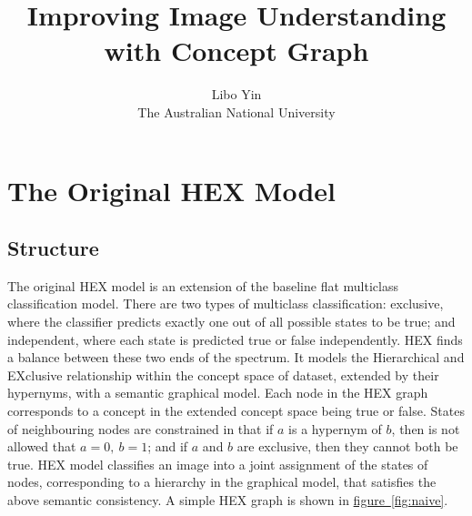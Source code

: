 \documentclass[11pt,a4paper]{article}
\begin{document}
\title{Improving Image Understanding with Concept Graph}
\author{Libo Yin\\The Australian National University}
\maketitle
\section{The Original HEX Model}
\subsection{Structure}

The original HEX model \cite{deng2014large} is an extension of the baseline flat multiclass classification model. There are two types of multiclass classification: exclusive, where the classifier predicts exactly one out of all possible states to be true; and independent, where each state is predicted true or false independently. HEX finds a balance between these two ends of the spectrum. It models the Hierarchical and EXclusive relationship within the concept space of dataset, extended by their hypernyms, with a semantic graphical model. Each node in the HEX graph corresponds to a concept in the extended concept space being true or false. States of neighbouring nodes are constrained in that if $a$ is a hypernym of $b$, then is not allowed that $a=0,\ b=1$; and if $a$ and $b$ are exclusive, then they cannot both be true. HEX model classifies an image into a joint assignment of the states of nodes, corresponding to a hierarchy in the graphical model, that satisfies the above semantic consistency. A simple HEX graph is shown in \hyperref[fig:naive]{figure~\ref{fig:naive}}.
\end{document}
